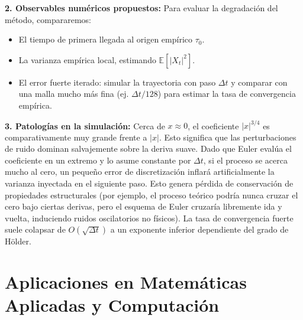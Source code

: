 \documentclass[11pt, letterpaper]{article}
\begin{document}
\begin{solucion}
    \textbf{2. Observables numéricos propuestos:}
    Para evaluar la degradación del método, compararemos:
    \begin{itemize}
        \item El tiempo de primera llegada al origen empírico $\tau_0$.
        \item La varianza empírica local, estimando $\mathbb{E}[|X_t|^2]$.
        \item El error fuerte iterado: simular la trayectoria con paso $\Delta t$ y comparar con una malla mucho más fina (ej. $\Delta t / 128$) para estimar la tasa de convergencia empírica.
    \end{itemize}

    \textbf{3. Patologías en la simulación:}
    Cerca de $x \approx 0$, el coeficiente $|x|^{3/4}$ es comparativamente muy grande frente a $|x|$. Esto significa que las perturbaciones de ruido dominan salvajemente sobre la deriva suave.
    Dado que Euler evalúa el coeficiente en un extremo y lo asume constante por $\Delta t$, si el proceso se acerca mucho al cero, un pequeño error de discretización inflará artificialmente la varianza inyectada en el siguiente paso. Esto genera pérdida de conservación de propiedades estructurales (por ejemplo, el proceso teórico podría nunca cruzar el cero bajo ciertas derivas, pero el esquema de Euler cruzaría libremente ida y vuelta, induciendo ruidos oscilatorios no físicos). La tasa de convergencia fuerte suele colapsar de $O(\sqrt{\Delta t})$ a un exponente inferior dependiente del grado de Hölder.
\end{solucion}

\newpage

\section{Aplicaciones en Matemáticas Aplicadas y Computación}
\end{document}
